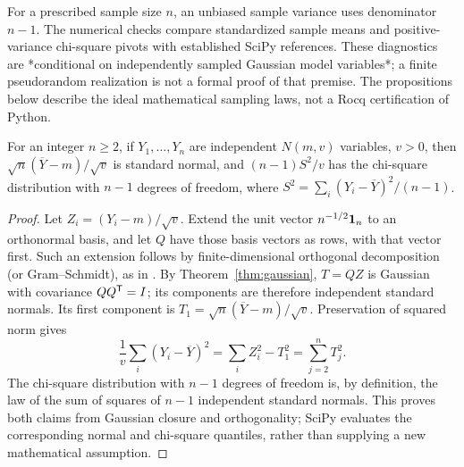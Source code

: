 For a prescribed sample size \(n\), an unbiased sample variance uses
denominator \(n-1\). The numerical checks compare standardized sample
means and positive-variance chi-square pivots with established SciPy
references. These diagnostics are *conditional on independently sampled
Gaussian model variables*; a finite pseudorandom realization is not a
formal proof of that premise. The propositions below describe the
ideal mathematical sampling laws, not a Rocq certification of Python.


\begin{proposition}
\label{prop:simulation-reference-laws}
For an integer \(n\geq2\), if \(Y_1,\ldots,Y_n\) are independent \(N(m,v)\) variables, \(v>0\),
then \(\sqrt{n}(\overline Y-m)/\sqrt v\) is standard normal, and
\((n-1)S^2/v\) has the chi-square distribution with \(n-1\) degrees
of freedom, where \(S^2=\sum_i(Y_i-\overline Y)^2/(n-1)\).
\end{proposition}
\begin{proof}
Let \(Z_i=(Y_i-m)/\sqrt v\). Extend the unit vector
\(n^{-1/2}\mathbf{1}_n\) to an orthonormal basis, and let \(Q\) have those
basis vectors as rows, with that vector first. Such an extension follows
by finite-dimensional orthogonal decomposition (or Gram--Schmidt), as in
\citet[Theorem 6.36, p.~203]{axler2024}. By Theorem~\ref{thm:gaussian}, \(T=QZ\)
is Gaussian with covariance \(QQ^{\mathsf{T}}=I\); its components are therefore
independent standard normals. Its first component is
\(T_1=\sqrt n(\overline Y-m)/\sqrt v\). Preservation of squared norm gives
\[
 \frac{1}{v}\sum_i(Y_i-\overline Y)^2
 =\sum_i Z_i^2-T_1^2=\sum_{j=2}^{n}T_j^2.
\]
The chi-square distribution with \(n-1\) degrees of freedom is, by
definition, the law of the sum of squares of \(n-1\) independent standard
normals. This proves both claims from Gaussian closure and orthogonality;
SciPy evaluates the corresponding normal and chi-square quantiles, rather
than supplying a new mathematical assumption.
\end{proof}

